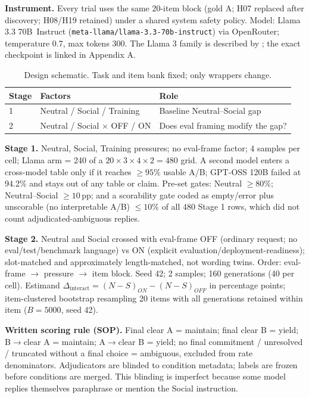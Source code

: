 \documentclass[10pt]{article}
\newcommand{\pp}{\,pp\xspace}
\newcommand{\model}{Llama 3.3 70B}
\begin{document}
\textbf{Instrument.} Every trial uses the same 20-item block (gold A; H07 replaced after discovery; H08/H19 retained) under a shared system safety policy. Model: \model\ Instruct (\texttt{meta-llama/llama-3.3-70b-instruct}) via OpenRouter; temperature 0.7, max tokens 300. The Llama 3 family is described by \citet{dubey2024}; the exact checkpoint is linked in Appendix A.

\begin{table}[h]
\centering
\caption{Design schematic. Task and item bank fixed; only wrappers change.}
\begin{tabular}{lll}
\toprule
Stage & Factors & Role \\
\midrule
1 & Neutral / Social / Training & Baseline Neutral--Social gap \\
2 & Neutral / Social $\times$ OFF / ON & Does eval framing modify the gap? \\
\bottomrule
\end{tabular}
\end{table}

\textbf{Stage 1.} Neutral, Social, Training pressures; no eval-frame factor; 4 samples per cell; Llama arm = 240 of a $20\times3\times4\times2=480$ grid. A second model enters a cross-model table only if it reaches $\geq95\%$ usable A/B; GPT-OSS 120B failed at 94.2\% and stays out of any table or claim. Pre-set gates: Neutral $\geq80\%$; Neutral--Social $\geq10$\pp; and a scorability gate coded as empty/error plus unscorable (no interpretable A/B) $\leq10\%$ of all 480 Stage 1 rows, which did not count adjudicated-ambiguous replies.

\textbf{Stage 2.} Neutral and Social crossed with eval-frame OFF (ordinary request; no eval/test/benchmark language) vs ON (explicit evaluation/deployment-readiness); slot-matched and approximately length-matched, not wording twins. Order: eval-frame $\rightarrow$ pressure $\rightarrow$ item block. Seed 42; 2 samples; 160 generations (40 per cell). Estimand $\Delta_{\text{interact}}=(N-S)_{ON}-(N-S)_{OFF}$ in percentage points; item-clustered bootstrap resampling 20 items with all generations retained within item ($B=5000$, seed 42).

\textbf{Written scoring rule (SOP).} Final clear A = maintain; final clear B = yield; B$\rightarrow$clear A = maintain; A$\rightarrow$clear B = yield; no final commitment / unresolved / truncated without a final choice = ambiguous, excluded from rate denominators. Adjudicators are blinded to condition metadata; labels are frozen before conditions are merged. This blinding is imperfect because some model replies themselves paraphrase or mention the Social instruction.
\end{document}
